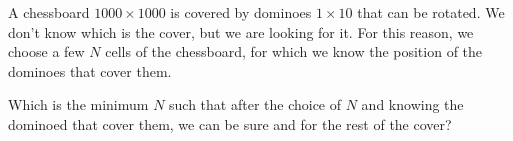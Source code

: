 A chessboard $1000 \times 1000$ is covered by dominoes $1 \times 10$ that can be rotated. We don't know which is the cover, but we are looking for it. For this reason, we choose a few $N$ cells of the chessboard, for which we know the position of the dominoes that cover them.

Which is the minimum $N$ such that after the choice of $N$ and knowing the dominoed that cover them, we can be sure and for the rest of the cover?
